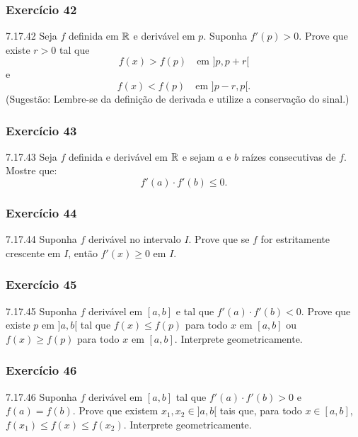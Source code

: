\subsubsection*{Exercício 42}
\begin{exercicio}[42]{7.17.42}
Seja $f$ definida em $\mathbb{R}$ e derivável em $p$. Suponha $f'(p) > 0$. Prove que existe $r > 0$ tal que
\[
f(x) > f(p) \quad \text{em } {]p, p + r[}
\]
e
\[
f(x) < f(p) \quad \text{em } {]p - r, p[}.
\]
(Sugestão: Lembre-se da definição de derivada e utilize a conservação do sinal.)
\end{exercicio}

\subsubsection*{Exercício 43}
\begin{exercicio}[43]{7.17.43}
Seja $f$ definida e derivável em $\mathbb{R}$ e sejam $a$ e $b$ raízes consecutivas de $f$. Mostre que:
\[
f'(a) \cdot f'(b) \le 0.
\]
\end{exercicio}

\subsubsection*{Exercício 44}
\begin{exercicio}[44]{7.17.44}
Suponha $f$ derivável no intervalo $I$. Prove que se $f$ for estritamente crescente em $I$, então $f'(x) \ge 0$ em $I$.
\end{exercicio}

\subsubsection*{Exercício 45}
\begin{exercicio}[45]{7.17.45}
Suponha $f$ derivável em $[a, b]$ e tal que $f'(a) \cdot f'(b) < 0$. Prove que existe $p$ em ${]a, b[}$ tal que $f(x) \le f(p)$ para todo $x$ em $[a, b]$ ou $f(x) \ge f(p)$ para todo $x$ em $[a, b]$. Interprete geometricamente.
\end{exercicio}

\subsubsection*{Exercício 46}
\begin{exercicio}[46]{7.17.46}
Suponha $f$ derivável em $[a, b]$ tal que $f'(a) \cdot f'(b) > 0$ e $f(a) = f(b)$. Prove que existem $x_1, x_2 \in {]a, b[}$ tais que, para todo $x \in [a, b]$, $f(x_1) \le f(x) \le f(x_2)$. Interprete geometricamente.
\end{exercicio}

